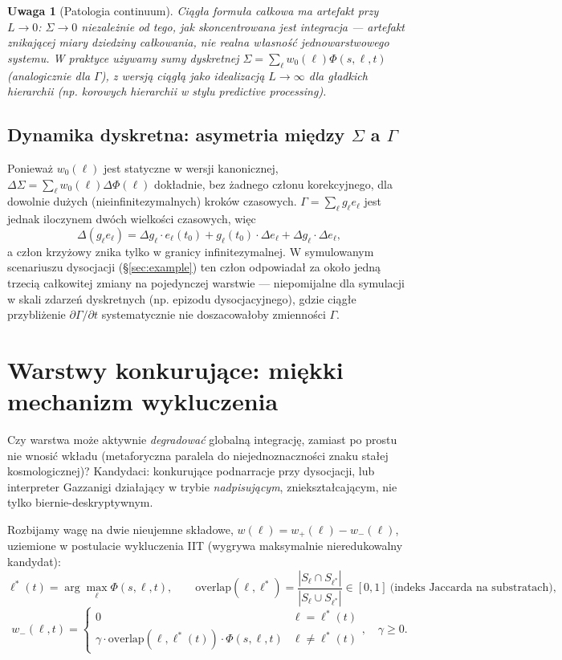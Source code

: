 \documentclass[11pt]{article}
\newtheorem*{remark}{Uwaga}
\begin{document}
\begin{remark}[Patologia continuum]\label{sec:pathology}
Ciągła formuła całkowa ma artefakt przy $L\to0$: $\Sigma\to0$ niezależnie od tego, jak skoncentrowana jest integracja --- artefakt znikającej miary dziedziny całkowania, nie realna własność jednowarstwowego systemu. W praktyce używamy sumy dyskretnej $\Sigma=\sum_\ell w_0(\ell)\Phi(s,\ell,t)$ (analogicznie dla $\Gamma$), z wersją ciągłą jako idealizacją $L\to\infty$ dla gładkich hierarchii (np. korowych hierarchii w stylu predictive processing).
\end{remark}

\subsection{Dynamika dyskretna: asymetria między $\Sigma$ a $\Gamma$}
Ponieważ $w_0(\ell)$ jest statyczne w wersji kanonicznej, $\Delta\Sigma=\sum_\ell w_0(\ell)\Delta\Phi(\ell)$ dokładnie, bez żadnego członu korekcyjnego, dla dowolnie dużych (nieinfinitezymalnych) kroków czasowych. $\Gamma=\sum_\ell g_\ell e_\ell$ jest jednak iloczynem dwóch wielkości czasowych, więc
\[
\Delta(g_\ell e_\ell) = \Delta g_\ell\cdot e_\ell(t_0) + g_\ell(t_0)\cdot\Delta e_\ell + \Delta g_\ell\cdot\Delta e_\ell,
\]
a człon krzyżowy znika tylko w granicy infinitezymalnej. W symulowanym scenariuszu dysocjacji (\S\ref{sec:example}) ten człon odpowiadał za około jedną trzecią całkowitej zmiany na pojedynczej warstwie --- niepomijalne dla symulacji w skali zdarzeń dyskretnych (np. epizodu dysocjacyjnego), gdzie ciągłe przybliżenie $\partial\Gamma/\partial t$ systematycznie nie doszacowałoby zmienności $\Gamma$.

\section{Warstwy konkurujące: miękki mechanizm wykluczenia}\label{sec:exclusion}

Czy warstwa może aktywnie \emph{degradować} globalną integrację, zamiast po prostu nie wnosić wkładu (metaforyczna paralela do niejednoznaczności znaku stałej kosmologicznej)? Kandydaci: konkurujące podnarracje przy dysocjacji, lub interpreter Gazzanigi działający w trybie \emph{nadpisującym}, zniekształcającym, nie tylko biernie-deskryptywnym.

Rozbijamy wagę na dwie nieujemne składowe, $w(\ell)=w_+(\ell)-w_-(\ell)$, uziemione w postulacie wykluczenia IIT (wygrywa maksymalnie nieredukowalny kandydat):
\[
\ell^*(t) = \arg\max_\ell \Phi(s,\ell,t), \qquad \text{overlap}(\ell,\ell^*) = \frac{|S_\ell\cap S_{\ell^*}|}{|S_\ell\cup S_{\ell^*}|}\in[0,1]\ \text{(indeks Jaccarda na substratach)},
\]
\[
w_-(\ell,t) = \begin{cases} 0 & \ell=\ell^*(t) \\ \gamma\cdot\text{overlap}(\ell,\ell^*(t))\cdot\Phi(s,\ell,t) & \ell\neq\ell^*(t)\end{cases}, \quad \gamma\ge0.
\]
\end{document}
